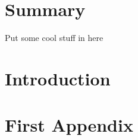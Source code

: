 \documentclass[11pt,]{article}
\begin{document}
\pagebreak


\section*{Summary}

Put some cool stuff in here

\pagebreak


{

\clearpage
\hypersetup{linkcolor=black}

\begin{singlespacing}{%
\setlength{\parskip}{0pt}

\tableofcontents

\clearpage
\listoffigures
{}
\pagebreak

\clearpage
\listoftables
{}
\pagebreak
}
\end{singlespacing}

}

\setcounter{page}{1}
\section{Introduction}

\cite{example}



\begin{singlespacing}
\clearpage
\hypersetup{linkcolor=black}
\printbibliography
{}
\clearpage
\end{singlespacing}

\appendix
\section{First Appendix}
\end{document}
